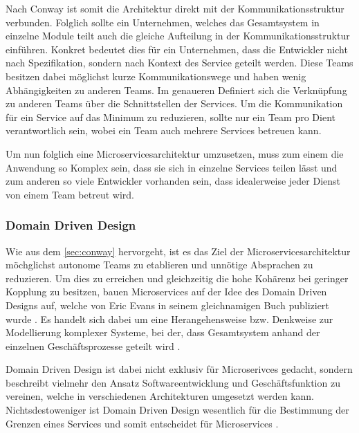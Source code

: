 Nach Conway ist somit die Architektur direkt mit der Kommunikationsstruktur verbunden. Folglich sollte ein Unternehmen, welches das Gesamtsystem in einzelne Module teilt auch die gleiche Aufteilung in der Kommunikationsstruktur einführen. Konkret bedeutet dies für ein Unternehmen, dass die Entwickler nicht nach Spezifikation, sondern nach Kontext des Service geteilt werden. Diese Teams besitzen dabei möglichst kurze Kommunikationswege und haben wenig Abhängigkeiten zu anderen Teams. Im genaueren Definiert sich die Verknüpfung zu anderen Teams über die Schnittstellen der Services.
Um die Kommunikation für ein Service auf das Minimum zu reduzieren, sollte nur ein Team pro Dient verantwortlich sein, wobei ein Team auch mehrere Services betreuen kann. 

Um nun folglich eine Microservicesarchitektur umzusetzen, muss zum einem die Anwendung so Komplex sein, dass sie sich in einzelne Services teilen lässt und zum anderen so viele Entwickler vorhanden sein, dass idealerweise jeder Dienst von einem Team betreut wird.

\subsubsection{Domain Driven Design}
\label{sec:ddd}

Wie aus dem \cref{sec:conway} hervorgeht, ist es das Ziel der Microservicesarchitektur möchglichst autonome Teams zu etablieren und unnötige Absprachen zu reduzieren. Um dies zu erreichen und gleichzeitig die hohe Kohärenz bei geringer Kopplung zu besitzen, bauen Microservices auf der Idee des Domain Driven Designs auf, welche von Eric Evans in seinem gleichnamigen Buch publiziert wurde \parencite[vgl.][Kap. 2.4]{newman_monolith_2019}. Es handelt sich dabei um eine Herangehensweise bzw. Denkweise zur Modellierung komplexer Systeme, bei der, dass Gesamtsystem anhand der einzelnen Geschäftsprozesse geteilt wird \parencite[vgl.][S. xix ff.]{evans_domain-driven_2003}.

Domain Driven Design ist dabei nicht exklusiv für Microserivces gedacht, sondern beschreibt vielmehr den Ansatz Softwareentwicklung und Geschäftsfunktion zu vereinen, welche in verschiedenen Architekturen umgesetzt werden kann. Nichtsdestoweniger ist Domain Driven Design wesentlich für die Bestimmung der Grenzen eines Services und somit entscheidet für Microservices \parencite[vgl.][Kap. 4.3]{wolff_microservices_2018}.

